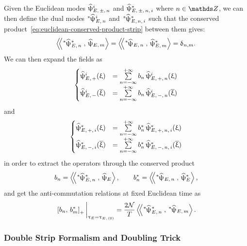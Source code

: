 Given the Euclidean modes $\widehat{\uppsi}^i_{E,\, \pm,\, n}$ and $\widehat{\uppsi}^*_{E,\, \pm,\, n,\, i}$ where $n \in \Z$, we can then define the dual modes $\dual{\hpsi}^i_{E,\, n}$ and $\dual{\hpsi}^*_{E,\, n,\, i}$ such that the conserved product~\eqref{eq:euclidean-conserved-product-strip} between them gives:
\begin{equation}
  \lconsprod{\dual{\hpsi}^*_{E,\, n}}{\hpsi_{E,\, m}}
  =
  \lconsprod{\dual{\hpsi}_{E,\, n}}{\hpsi^*_{E,\, m}}
  =
  \delta_{n,m}.
\end{equation}
We can then expand the fields as
\begin{equation}
  \begin{cases}
    \widehat{\uppsi}^i_{E,\, +}(\upxi)
    & =
    \sum\limits_{n = -\infty}^{+\infty} b_n\, \widehat{\uppsi}^i_{E,\, +,\, n}(\upxi)
    \\
    \widehat{\uppsi}^i_{E,\, -}(\overline{\upxi})
    & =
    \sum\limits_{n = -\infty}^{+\infty} b_n\, \widehat{\uppsi}^i_{E,\, -,\, n}(\overline{\upxi})
  \end{cases}
\end{equation}
and
\begin{equation}
  \begin{cases}
    \widehat{\uppsi}^*_{E,\, +,\, i}(\upxi)
    & =
    \sum\limits_{n = -\infty}^{+\infty} b^*_n\, \widehat{\uppsi}^*_{E,\, +,\, n,\, i}(\upxi)
    \\
    \widehat{\uppsi}^*_{E,\, -,\, i}(\overline{\upxi})
    & =
    \sum\limits_{n = -\infty}^{+\infty} b^*_n\, \widehat{\uppsi}^*_{E,\, -,\, n,\, i}(\overline{\upxi})
  \end{cases}
\end{equation}
in order to extract the operators through the conserved product
\begin{equation}
  b_n
  =
  \lconsprod{\dual{\hpsi}^*_{E,\, n}}{\hpsi_{E}},
  \qquad
  b^*_n
  =
  \lconsprod{\dual{\hpsi}_{E,\, n}}{\hpsi^*_{E}},
\end{equation}
and get the anti-commutation relations at fixed Euclidean time as
\begin{equation}
  \eval{ \liebraket{b_n}{b^*_m}_+ }_{\tau_E = \tau_{E,\, (0)}}
  =
  \frac{2 \cN}{T}
  \lconsprod{\dual{\hpsi}^*_{E,\, n}}{\dual{\hpsi}_{E,\, m}}.
\end{equation}


\subsubsection{Double Strip Formalism and Doubling Trick}


